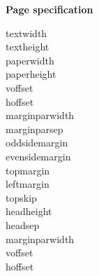 \documentclass[12pt,twoside]{../Filofax-Template/filofax2}
\begin{document}
\begin{ffpage}{\Huge \bf Page specification}


textwidth \the\textwidth\\
textheight \the\textheight\\
paperwidth \the\paperwidth\\
paperheight \the\paperheight\\

voffset \the\voffset \\ 
hoffset \the\hoffset \\

marginparwidth \the \marginparwidth \\
marginparsep \the \marginparsep \\

oddsidemargin \the\oddsidemargin  \\
evensidemargin \the\evensidemargin \\


topmargin \the\topmargin \\
leftmargin \the\leftmargin \\
topskip \the\topskip \\
headheight \the\headheight \\
headsep \the\headsep \\
marginparwidth \the\marginparwidth \\

voffset \the\voffset \\
hoffset \the\hoffset \\




\end{ffpage}
\end{document}
